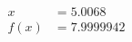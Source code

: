 \documentclass[preview]{standalone}
\begin{document}
\begin{align*}
x &= 5.0068\\f(x) &= 7.9999942
\end{align*}
\end{document}
